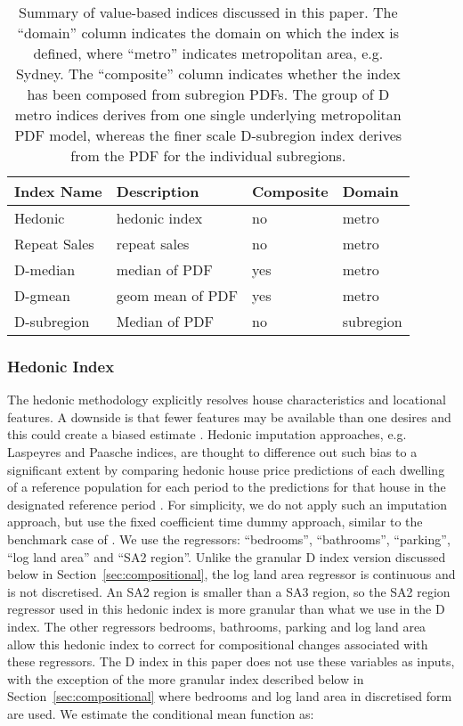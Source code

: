 \begin{table}[h!]
	\centering
	\begin{tabular}{llll}
		\toprule
		Index Name &  Description & Composite & Domain  \\
		\midrule
		Hedonic &  hedonic index & no & metro     \\
		Repeat Sales &  repeat sales & no & metro       \\

		D-median &  median of PDF & yes & metro      \\
		D-gmean &   geom mean of PDF & yes & metro   \\

		D-subregion &  Median of PDF & no & subregion      \\

		\bottomrule
	\end{tabular}
	\caption{Summary of value-based indices discussed in this paper. The ``domain'' column indicates the domain on which the index is defined, where ``metro'' indicates metropolitan area, e.g. Sydney. The ``composite'' column indicates whether the index has been composed from subregion PDFs. The group of D metro indices derives from one single underlying metropolitan PDF model, whereas the finer scale D-subregion index derives from the PDF for the individual subregions. }
	\label{table:indices}
\end{table}

\subsubsection{Hedonic Index}


The hedonic methodology \citep{rosen:1974} explicitly resolves house characteristics and locational features. A downside is that fewer features may be available than one desires and this could create a biased estimate \citep[e.g.][]{ekeland_et_al2004}. Hedonic imputation approaches, e.g. Laspeyres and Paasche indices, are thought to difference out such bias to a significant extent by comparing hedonic house price predictions of each dwelling of a reference population for each period to the predictions for that house in the designated reference period \citep{waltl2019}.
For simplicity, we do not apply such an imputation approach, but use the fixed coefficient time dummy approach, similar to the benchmark case of \citet{waltl2019}.   We use the regressors: ``bedrooms'', ``bathrooms'', ``parking'', ``log land area'' and ``SA2 region''.  Unlike the granular D index version discussed below in Section~\ref{sec:compositional}, the log land area regressor is continuous and is not discretised.
An SA2 region is smaller than a SA3 region, so the SA2 region regressor used in this hedonic index is more granular than what we use in the D index. The other regressors bedrooms, bathrooms, parking and log land area allow this hedonic index to correct for compositional changes associated with these regressors. The D index in this paper does not use these variables as inputs, with the exception of the more granular index described below in Section~\ref{sec:compositional} where bedrooms and log land area in discretised form are used.
We estimate the conditional mean function as:

